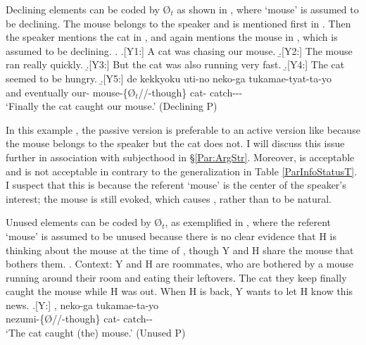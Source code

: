 Declining elements can be coded by {\O$_{t}$}
as shown in \Next,
where `mouse' is assumed to be declining.
The mouse belongs to the speaker and is mentioned first in \Next[-Y2].
Then the speaker mentions the cat in \Next[-Y3-4],
and again mentions the mouse in \Next[-Y5], which is assumed to be declining.
%
\ex.
 \a.[Y1:] A cat was chasing our mouse.
 \b.[Y2:] The mouse ran really quickly.
 \b.[Y3:] But the cat was also running very fast.
 \b.[Y4:] The cat seemed to be hungry.
 \b.[Y5:] de kekkyoku uti-no  neko-ga tukamae-tyat-ta-yo \\
   and eventually our- {mouse-\{{\O$_{t}$}//-though\}} cat- catch--- \\
   `Finally the cat caught our mouse.' \hfill{(Declining  P)}

In this example \Last[-Y5],
the passive version is preferable to an active version like \Last[-Y5]
because the mouse belongs to the speaker but the cat does not.
I will discuss this issue further in association with subjecthood in \S \ref{Par:ArgStr}.
Moreover,
 is acceptable and  is not acceptable in \Last[-Y5]
contrary to the generalization in Table \ref{ParInfoStatusT}.
I suspect that this is because the referent `mouse' is the center of the speaker's interest;
the mouse is still evoked,
which causes , rather than  to be natural.

Unused elements can be coded by {\O$_{t}$},
as exemplified in \Next,
where the referent `mouse' is assumed to be unused
because there is no clear evidence that H is thinking about the mouse at the time of ,
though Y and H share the mouse that bothers them.
%
\ex. \label{UnusedMouse}Context: Y and H are roommates,
	who are bothered by a mouse running around their room
	and eating their leftovers.
	The cat they keep finally caught the mouse while H was out.
	When H is back, Y wants to let H know this news.
	\ag.[Y:] , neko-ga tukamae-ta-yo \\
		nezumi-\{{\O}//-though\} cat- catch-- \\
		`The cat caught (the) mouse.' \hfill{(Unused  P)}


